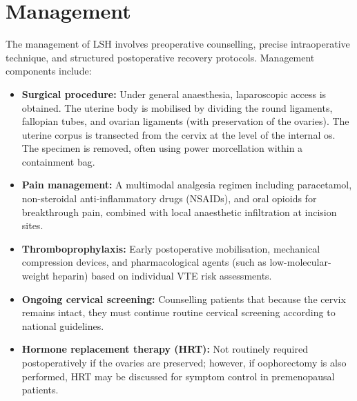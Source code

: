 \section*{Management}
The management of LSH involves preoperative counselling, precise intraoperative technique, and structured postoperative recovery protocols. Management components include:
\begin{itemize}
    \item \textbf{Surgical procedure:} Under general anaesthesia, laparoscopic access is obtained. The uterine body is mobilised by dividing the round ligaments, fallopian tubes, and ovarian ligaments (with preservation of the ovaries). The uterine corpus is transected from the cervix at the level of the internal os. The specimen is removed, often using power morcellation within a containment bag.
    \item \textbf{Pain management:} A multimodal analgesia regimen including paracetamol, non-steroidal anti-inflammatory drugs (NSAIDs), and oral opioids for breakthrough pain, combined with local anaesthetic infiltration at incision sites.
    \item \textbf{Thromboprophylaxis:} Early postoperative mobilisation, mechanical compression devices, and pharmacological agents (such as low-molecular-weight heparin) based on individual VTE risk assessments.
    \item \textbf{Ongoing cervical screening:} Counselling patients that because the cervix remains intact, they must continue routine cervical screening according to national guidelines.
    \item \textbf{Hormone replacement therapy (HRT):} Not routinely required postoperatively if the ovaries are preserved; however, if oophorectomy is also performed, HRT may be discussed for symptom control in premenopausal patients.
\end{itemize}

